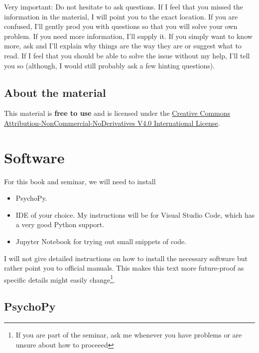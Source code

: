 \documentclass[
]{book}
\providecommand{\tightlist}{%
  \setlength{\itemsep}{0pt}\setlength{\parskip}{0pt}}
\begin{document}
Very important: Do not hesitate to ask questions. If I feel that you missed the information in the material, I will point you to the exact location. If you are confused, I'll gently prod you with questions so that you will solve your own problem. If you need more information, I'll supply it. If you simply want to know more, ask and I'll explain why things are the way they are or suggest what to read. If I feel that you should be able to solve the issue without my help, I'll tell you so (although, I would still probably ask a few hinting questions).

\hypertarget{about-the-material}{%
\section{About the material}\label{about-the-material}}

This material is \textbf{free to use} and is licensed under the \href{https://creativecommons.org/licenses/by-nc-nd/4.0/}{Creative Commons Attribution-NonCommercial-NoDerivatives V4.0 International License}.

\hypertarget{software}{%
\chapter{Software}\label{software}}

For this book and seminar, we will need to install

\begin{itemize}
\tightlist
\item
  PsychoPy.
\item
  IDE of your choice. My instructions will be for Visual Studio Code, which has a very good Python support.
\item
  Jupyter Notebook for trying out small snippets of code.
\end{itemize}

I will not give detailed instructions on how to install the necessary software but rather point you to official manuals. This makes this text more future-proof as specific details might easily change\footnote{If you are part of the seminar, ask me whenever you have problems or are unsure about how to proceeed}.

\hypertarget{install-psychopy}{%
\section{PsychoPy}\label{install-psychopy}}
\end{document}
